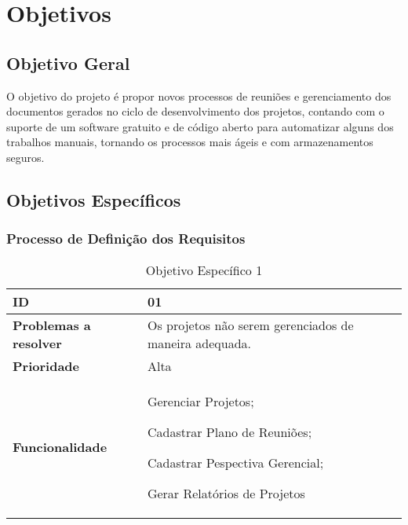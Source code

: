 \chapter[Objetivos]{Objetivos}
\label{cp:objetivos}

\section{Objetivo Geral}

O objetivo do projeto é propor novos processos de reuniões e gerenciamento dos documentos gerados no ciclo de desenvolvimento dos projetos, contando com o suporte de um software gratuito e de código aberto para automatizar alguns dos trabalhos manuais, tornando os processos mais ágeis e com armazenamentos seguros.

\section{Objetivos Específicos} 

\subsection{Processo de Definição dos Requisitos}

\begin{table}[H]
    \centering
    \begin{tabular}{|p{4.5cm}|p{12.0cm}|}
    \hline
    \cellcolor[HTML]{C0C0C0}\textbf{ID} &  01 \\ \hline
    \cellcolor[HTML]{C0C0C0}\textbf{Problemas a resolver} & Os projetos não serem gerenciados de maneira adequada. \\ \hline
    \cellcolor[HTML]{C0C0C0}\textbf{Prioridade} & Alta \\ \hline
    \cellcolor[HTML]{C0C0C0}\textbf{Funcionalidade} & Gerenciar Projetos; \par Cadastrar Plano de Reuniões; \par Cadastrar Pespectiva Gerencial; \par Gerar Relatórios de Projetos \\ \hline
    \end{tabular}
    \caption{Objetivo Específico 1}
    \label{tab:objetivo_especifico_01}
\end{table}